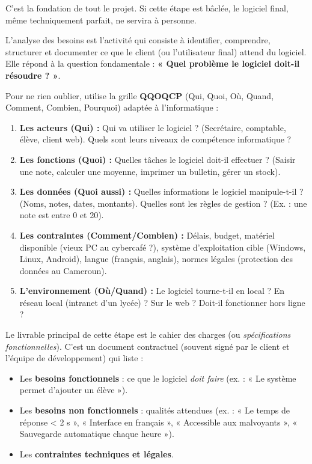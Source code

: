 \documentclass[11pt]{article}
\newcommand{\cle}[1]{{\popxbold\color{popdark}#1}}
\begin{document}
C'est la fondation de tout le projet. Si cette étape est bâclée, le logiciel final, même techniquement parfait, ne servira à personne.

\begin{definition}
L'\cle{analyse des besoins} est l'activité qui consiste à identifier, comprendre, structurer et documenter ce que le client (ou l'utilisateur final) attend du logiciel. Elle répond à la question fondamentale : \textbf{« Quel problème le logiciel doit-il résoudre ? »}.
\end{definition}

\begin{methode}
Pour ne rien oublier, utilise la grille \textbf{QQOQCP} (Qui, Quoi, Où, Quand, Comment, Combien, Pourquoi) adaptée à l'informatique :
\begin{enumerate}
    \item \textbf{Les acteurs (Qui) :} Qui va utiliser le logiciel ? (Secrétaire, comptable, élève, client web). Quels sont leurs niveaux de compétence informatique ?
    \item \textbf{Les fonctions (Quoi) :} Quelles tâches le logiciel doit-il effectuer ? (Saisir une note, calculer une moyenne, imprimer un bulletin, gérer un stock).
    \item \textbf{Les données (Quoi aussi) :} Quelles informations le logiciel manipule-t-il ? (Noms, notes, dates, montants). Quelles sont les règles de gestion ? (Ex. : une note est entre 0 et 20).
    \item \textbf{Les contraintes (Comment/Combien) :} Délais, budget, matériel disponible (vieux PC au cybercafé ?), système d'exploitation cible (Windows, Linux, Android), langue (français, anglais), normes légales (protection des données au Cameroun).
    \item \textbf{L'environnement (Où/Quand) :} Le logiciel tourne-t-il en local ? En réseau local (intranet d'un lycée) ? Sur le web ? Doit-il fonctionner hors ligne ?
\end{enumerate}
\end{methode}

\begin{propriete}
Le livrable principal de cette étape est le \cle{cahier des charges} (ou \emph{spécifications fonctionnelles}). C'est un document contractuel (souvent signé par le client et l'équipe de développement) qui liste :
\begin{itemize}
    \item Les \textbf{besoins fonctionnels} : ce que le logiciel \emph{doit faire} (ex. : « Le système permet d'ajouter un élève »).
    \item Les \textbf{besoins non fonctionnels} : qualités attendues (ex. : « Le temps de réponse < 2 s », « Interface en français », « Accessible aux malvoyants », « Sauvegarde automatique chaque heure »).
    \item Les \textbf{contraintes techniques et légales}.
\end{itemize}
\end{propriete}
\end{document}
